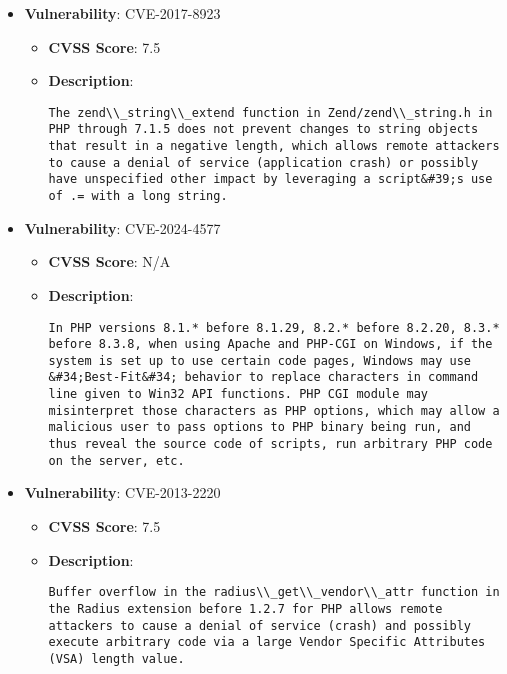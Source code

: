 \documentclass{article}
\begin{document}
\begin{itemize}
        \item \textbf{Vulnerability}: CVE-2017-8923
        \begin{itemize}
            \item \textbf{CVSS Score}:  7.5 
            \item \textbf{Description}:
            \parbox[t]{0.9\linewidth}{
                \verb|The zend\\_string\\_extend function in Zend/zend\\_string.h in PHP through 7.1.5 does not prevent changes to string objects that result in a negative length, which allows remote attackers to cause a denial of service (application crash) or possibly have unspecified other impact by leveraging a script&#39;s use of .= with a long string.|
            }
        \end{itemize}
    
        \item \textbf{Vulnerability}: CVE-2024-4577
        \begin{itemize}
            \item \textbf{CVSS Score}:  N/A 
            \item \textbf{Description}:
            \parbox[t]{0.9\linewidth}{
                \verb|In PHP versions 8.1.* before 8.1.29, 8.2.* before 8.2.20, 8.3.* before 8.3.8, when using Apache and PHP-CGI on Windows, if the system is set up to use certain code pages, Windows may use &#34;Best-Fit&#34; behavior to replace characters in command line given to Win32 API functions. PHP CGI module may misinterpret those characters as PHP options, which may allow a malicious user to pass options to PHP binary being run, and thus reveal the source code of scripts, run arbitrary PHP code on the server, etc.|
            }
        \end{itemize}
    
        \item \textbf{Vulnerability}: CVE-2013-2220
        \begin{itemize}
            \item \textbf{CVSS Score}:  7.5 
            \item \textbf{Description}:
            \parbox[t]{0.9\linewidth}{
                \verb|Buffer overflow in the radius\\_get\\_vendor\\_attr function in the Radius extension before 1.2.7 for PHP allows remote attackers to cause a denial of service (crash) and possibly execute arbitrary code via a large Vendor Specific Attributes (VSA) length value.|
            }
        \end{itemize}
    

\end{itemize}
\end{document}
